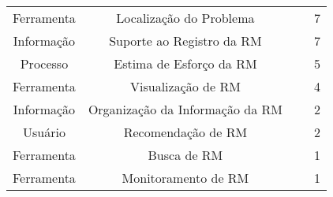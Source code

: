 \begin{table}[htbp]
{\begin{tabular}{|c|c|l|c|}
\multirow{3}{*}{Ferramenta}   & \multirow{3}{*}{Localização do Problema}      & \cite{Bangcharoensap:2012:LSC:2419061.2419428,corley2011recovering,Nguyen:2012:MAR:2393596.2393671}      & \multirow{3}{*}{7}  \\
                              &                                               & \cite{Thung:2014:BIT:2635868.2661678,Wong:2014:BBF:2705615.2706096}                                      &                     \\
                              &                                               & \cite{Romo:2015:TAT:2745802.2745833,thung2013automatic}                                                  &                     \\ \hline
\multirow{2}{*}{Informação}   & \multirow{2}{*}{Suporte ao Registro da RM}    & \cite{Bettenburg2008a,Correa2013b,moran2015auto,Moran:2015:EAA:2786805.2807557}                          & \multirow{2}{*}{7}  \\
                              &                                               & \cite{Tu:2014:MQI:2677832.2677844,White:2015:GRR:2820282.2820291,Wu2011a}                                &                     \\ \hline
\multirow{2}{*}{Processo}     & \multirow{2}{*}{Estima de Esforço da RM}      & \cite{Bhattacharya:2011:BTP:1985441.1985472,Nagwani2010,thung2012would}                                  & \multirow{2}{*}{5}  \\
                              &                                               & \cite{Vijayakumar2014,xia2015automatic}                                                                  &                     \\ \hline
Ferramenta                    & Visualização de RM                            & \cite{dal2013closer,dal2014bug,hora2012bug,takama2013application}                                        & 4                   \\ \hline
Informação                    & Organização da Informação da RM               & \cite{mani2012ausum,otoom2016severity}                                                                   & 2                   \\ \hline
Usuário                       & Recomendação de RM                            & \cite{malheiros2012source,Wang2011bug}                                                                   & 2                   \\ \hline
Ferramenta                   & Busca de RM                                   & \cite{liu2014faceted}                                                                                    & 1                   \\ \hline
Ferramenta                    & Monitoramento de RM                           &~\cite{Aggarwal:2014:MIT:2593801.2593810}                                                                 & 1                   \\ \hline
\end{tabular}%
}
\end{table}
